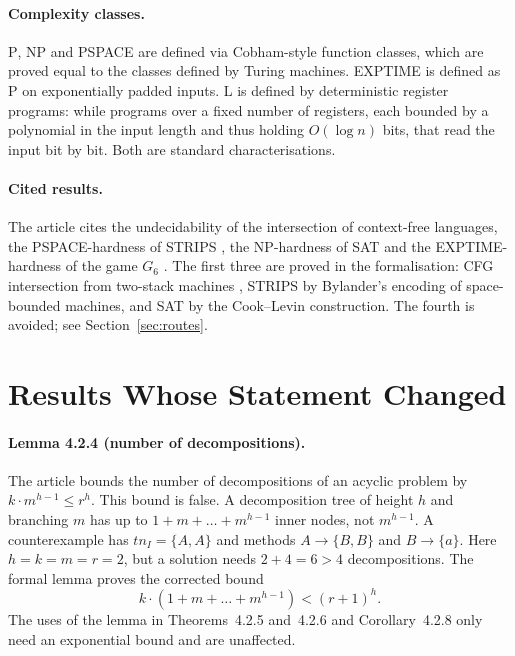 \documentclass[manuscript, screen]{jair}
\newcommand{\lean}[1]{\texttt{\detokenize{#1}}}
\newcommand{\cls}[1]{\textsc{#1}}
\newcommand{\tnI}{\mathit{tn}_I}
\begin{document}
\paragraph{Complexity classes.} \cls{P}, \cls{NP} and \cls{PSPACE} are defined via
Cobham-style function classes, which are proved equal to the classes defined by Turing
machines. \cls{EXPTIME} is defined as \cls{P} on exponentially padded inputs. \cls{L} is
defined by deterministic register programs: while programs over a fixed number of registers,
each bounded by a polynomial in the input length and thus holding $O(\log n)$ bits, that read
the input bit by bit. Both are standard characterisations.

\paragraph{Cited results.} The article cites the undecidability of the intersection of
context-free languages, the \cls{PSPACE}-hardness of STRIPS \parencite{bylander:aij-94}, the
\cls{NP}-hardness of SAT \parencite{cook:stoc-71} and the \cls{EXPTIME}-hardness of the game
$G_6$ \parencite{stockmeyer:chandra:siamjc-79}. The first three are proved in the
formalisation: CFG intersection from two-stack machines \parencite{minsky:67}, STRIPS by
Bylander's encoding of space-bounded machines, and SAT by the Cook--Levin construction. The
fourth is avoided; see Section~\ref{sec:routes}.

\section{Results Whose Statement Changed}\label{sec:statements}

\paragraph{Lemma 4.2.4 (number of decompositions).} The article bounds the number of
decompositions of an acyclic problem by $k \cdot m^{h-1} \le r^h$. This bound is false. A
decomposition tree of height $h$ and branching $m$ has up to $1 + m + \dots + m^{h-1}$ inner
nodes, not $m^{h-1}$. A counterexample has $\tnI = \{A, A\}$ and methods $A \to \{B, B\}$ and
$B \to \{a\}$. Here $h = k = m = r = 2$, but a solution needs $2 + 4 = 6 > 4$ decompositions. The
formal lemma \lean{lem_4_2_4} proves the corrected bound
\[
  k \cdot (1 + m + \dots + m^{h-1}) < (r+1)^h .
\]
The uses of the lemma in Theorems~4.2.5 and~4.2.6 and Corollary~4.2.8 only need an exponential
bound and are unaffected.
\end{document}
